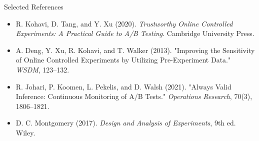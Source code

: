 \documentclass[aspectratio=169]{beamer}
\begin{document}
\begin{frame}{Selected References}
  \small
  \begin{itemize}
    \item R. Kohavi, D. Tang, and Y. Xu (2020). \textit{Trustworthy Online Controlled Experiments: A Practical Guide to A/B Testing}. Cambridge University Press.
    \item A. Deng, Y. Xu, R. Kohavi, and T. Walker (2013). "Improving the Sensitivity of Online Controlled Experiments by Utilizing Pre-Experiment Data." \textit{WSDM}, 123--132.
    \item R. Johari, P. Koomen, L. Pekelis, and D. Walsh (2021). "Always Valid Inference: Continuous Monitoring of A/B Tests." \textit{Operations Research}, 70(3), 1806--1821.
    \item D. C. Montgomery (2017). \textit{Design and Analysis of Experiments}, 9th ed. Wiley.
  \end{itemize}
\end{frame}

\contactslide
\end{document}
